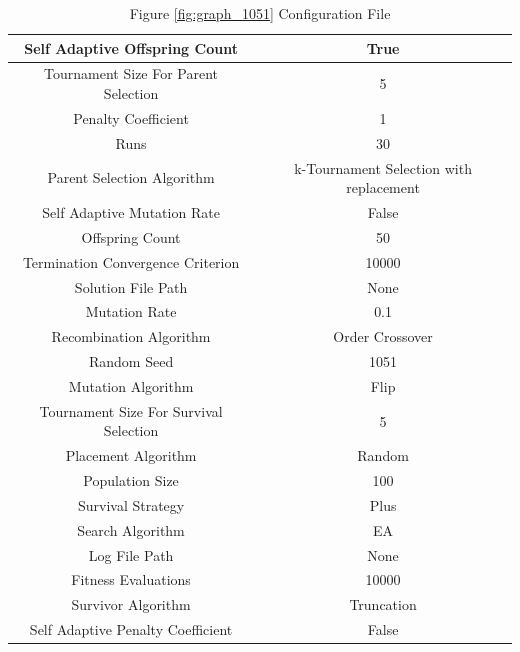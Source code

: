 \documentclass{standalone}
\begin{document}
\clearpage
\begin{table}[!htb]
	\centering
	\caption{Figure \ref{fig:graph_1051} Configuration File}
	\label{tab:graph_1051}
	\begin{tabular}{| c | c |}
		\hline
		Self Adaptive Offspring Count		& True		 \\
		\hline
		Tournament Size For Parent Selection		& 5		 \\
		\hline
		Penalty Coefficient		& 1		 \\
		\hline
		Runs		& 30		 \\
		\hline
		Parent Selection Algorithm		& k-Tournament Selection with replacement		 \\
		\hline
		Self Adaptive Mutation Rate		& False		 \\
		\hline
		Offspring Count		& 50		 \\
		\hline
		Termination Convergence Criterion		& 10000		 \\
		\hline
		Solution File Path		& None		 \\
		\hline
		Mutation Rate		& 0.1		 \\
		\hline
		Recombination Algorithm		& Order Crossover		 \\
		\hline
		Random Seed		& 1051		 \\
		\hline
		Mutation Algorithm		& Flip		 \\
		\hline
		Tournament Size For Survival Selection		& 5		 \\
		\hline
		Placement Algorithm		& Random		 \\
		\hline
		Population Size		& 100		 \\
		\hline
		Survival Strategy		& Plus		 \\
		\hline
		Search Algorithm		& EA		 \\
		\hline
		Log File Path		& None		 \\
		\hline
		Fitness Evaluations		& 10000		 \\
		\hline
		Survivor Algorithm		& Truncation		 \\
		\hline
		Self Adaptive Penalty Coefficient		& False		 \\
		\hline
	\end{tabular}
\end{table}
\end{document}
